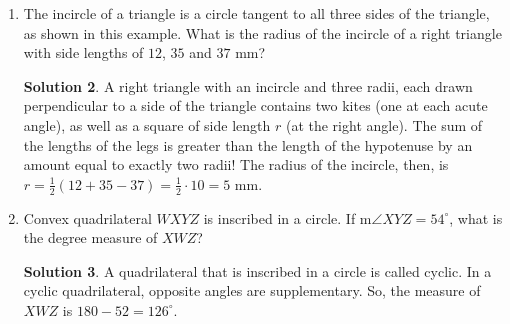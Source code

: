 \documentclass{article}
\theoremstyle{definition}
\newtheorem*{solution}{Solution}
\begin{document}
\begin{multicols}{2}
\begin{enumerate}
\begin{center}
            \end{center}
            \begin{solution}
                Since $\angle ABC$ is one-half the sum of arc $\stackrel{\mbox{\large$\frown$}}{AB}$ and arc $\stackrel{\mbox{\large$\frown$}}{DE}$, we have $\angle ACB = 50^{\circ}$.
                Since $\angle ACB + \angle AC = 180^{\circ}$, we find that $\angle ACD = 130^{\circ}$.
            \end{solution}
        \item The incircle of a triangle is a circle tangent to all three sides of the triangle, as shown in this example.
            What is the radius of the incircle of a right triangle with side lengths of $12$, $35$ and $37$ mm?
            \begin{center}
            \end{center}
            \begin{solution}
                A right triangle with an incircle and three radii, each drawn perpendicular to a side of the triangle contains two kites (one at each acute angle), as well as a square of side length $r$ (at the right angle).
                The sum of the lengths of the legs is greater than the length of the hypotenuse by an amount equal to exactly two radii!
                The radius of the incircle, then, is $r = \frac{1}{2} (12 + 35 - 37) = \frac{1}{2} \cdot 10 = 5$ mm.
            \end{solution}
        \item Convex quadrilateral $WXYZ$ is inscribed in a circle. If m$\angle XYZ = 54^{\circ}$, what is the degree measure of $XWZ$?
            \begin{solution}
                A quadrilateral that is inscribed in a circle is called cyclic. In a cyclic quadrilateral, opposite angles are supplementary.
                So, the measure of $XWZ$ is $180 - 52 = 126^{\circ}$.
            \end{solution}
    \end{enumerate}
\end{multicols}
\end{document}

